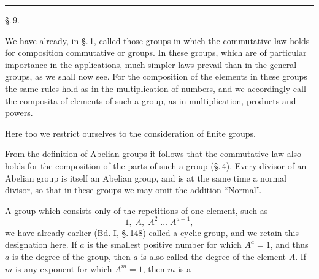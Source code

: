 \begin{center}


\rule{0.3\linewidth}{0.4pt}

\S.\,9.

\end{center}

We have already, in \S.\,1, called those groups in which the commutative law holds for composition commutative or  groups. In these groups, which are of particular importance in the applications, much simpler laws prevail than in the general groups, as we shall now see. For the composition of the elements in these groups the same rules hold as in the multiplication of numbers, and we accordingly call the composita of elements of such a group, as in multiplication, products and powers.

Here too we restrict ourselves to the consideration of finite groups.

From the definition of Abelian groups it follows that the commutative law also holds for the composition of the parts of such a group (\S.\,4). Every divisor of an Abelian group is itself an Abelian group, and is at the same time a normal divisor, so that in these groups we may omit the addition ``Normal''.

A group which consists only of the repetitions of one element, such as
\[ 1, \; A, \; A^2 \; \ldots \; A^{a-1}, \]
we have already earlier (Bd. I, \S.\,148) called a cyclic group, and we retain this designation here. If $a$ is the smallest positive number for which $A^a = 1$, and thus $a$ is the degree of the group, then $a$ is also called the degree of the element $A$. If $m$ is any exponent for which $A^m = 1$, then $m$ is a
